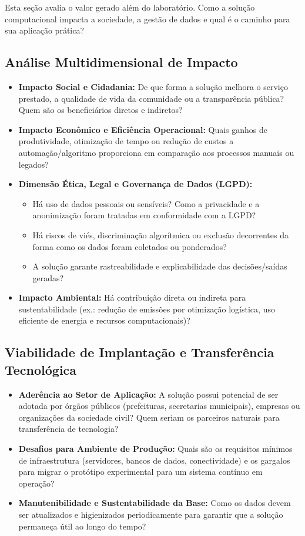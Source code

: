 \documentclass[11pt,a4paper]{article}
\begin{document}
\begin{instrucao}
Esta seção avalia o valor gerado além do laboratório. Como a solução computacional impacta a sociedade, a gestão de dados e qual é o caminho para sua aplicação prática?
\end{instrucao}

\subsection{Análise Multidimensional de Impacto}
\begin{itemize}
    \item \textbf{Impacto Social e Cidadania:} De que forma a solução melhora o serviço prestado, a qualidade de vida da comunidade ou a transparência pública? Quem são os beneficiários diretos e indiretos?
    \item \textbf{Impacto Econômico e Eficiência Operacional:} Quais ganhos de produtividade, otimização de tempo ou redução de custos a automação/algoritmo proporciona em comparação aos processos manuais ou legados?
    \item \textbf{Dimensão Ética, Legal e Governança de Dados (LGPD):}
    \begin{itemize}
        \item Há uso de dados pessoais ou sensíveis? Como a privacidade e a anonimização foram tratadas em conformidade com a LGPD?
        \item Há riscos de viés, discriminação algorítmica ou exclusão decorrentes da forma como os dados foram coletados ou ponderados?
        \item A solução garante rastreabilidade e explicabilidade das decisões/saídas geradas?
    \end{itemize}
    \item \textbf{Impacto Ambiental:} Há contribuição direta ou indireta para sustentabilidade (ex.: redução de emissões por otimização logística, uso eficiente de energia e recursos computacionais)?
\end{itemize}

\subsection{Viabilidade de Implantação e Transferência Tecnológica}
\begin{itemize}
    \item \textbf{Aderência ao Setor de Aplicação:} A solução possui potencial de ser adotada por órgãos públicos (prefeituras, secretarias municipais), empresas ou organizações da sociedade civil? Quem seriam os parceiros naturais para transferência de tecnologia?
    \item \textbf{Desafios para Ambiente de Produção:} Quais são os requisitos mínimos de infraestrutura (servidores, bancos de dados, conectividade) e os gargalos para migrar o protótipo experimental para um sistema contínuo em operação?
    \item \textbf{Manutenibilidade e Sustentabilidade da Base:} Como os dados devem ser atualizados e higienizados periodicamente para garantir que a solução permaneça útil ao longo do tempo?
\end{itemize}
\end{document}
